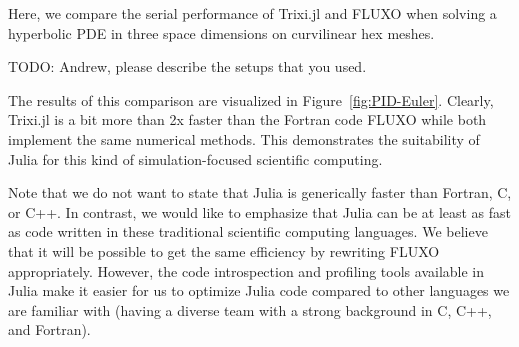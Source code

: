 \documentclass{juliacon}
\begin{document}
Here, we compare the serial performance of Trixi.jl and FLUXO when solving a
hyperbolic PDE in three space dimensions on curvilinear hex meshes.

TODO: Andrew, please describe the setups that you used. %

The results of this comparison are visualized in Figure~\ref{fig:PID-Euler}.
Clearly, Trixi.jl is a bit more than 2x faster than the Fortran code FLUXO
while both implement the same numerical methods. This demonstrates the
suitability of Julia for this kind of simulation-focused scientific computing.

Note that we do not want to state that Julia is generically faster than Fortran,
C, or C++. In contrast, we would like to emphasize that Julia can be at least
as fast as code written in these traditional scientific computing languages.
We believe that it will be possible to get the same efficiency by rewriting
FLUXO appropriately. However, the code introspection and profiling tools available
in Julia make it easier for us to optimize Julia code compared to other languages
we are familiar with (having a diverse team with a strong background in C, C++,
and Fortran).
\end{document}
